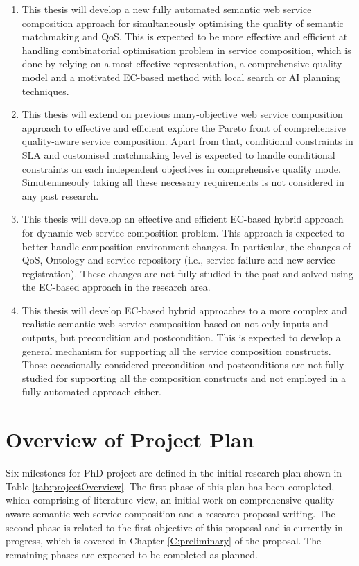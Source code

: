 \begin{enumerate}
 \item This thesis will develop a new fully automated semantic web service composition approach for simultaneously optimising the quality of semantic matchmaking and QoS. This is expected to be more effective and efficient at handling combinatorial optimisation problem in service composition, which is done by relying on a most effective representation, a comprehensive quality model and a motivated EC-based method with local search or AI planning techniques.

\item This thesis will extend on previous many-objective web service composition approach to effective and efficient explore the Pareto front of comprehensive quality-aware service composition. Apart from that, conditional constraints in SLA and customised matchmaking level is expected to handle conditional constraints on each independent objectives in comprehensive quality mode. Simutenaneouly taking all these necessary requirements is not considered in any past research. 

\item This thesis will develop an effective and efficient EC-based hybrid approach for dynamic web service composition problem. This approach is expected to better handle composition environment changes. In particular, the changes of QoS, Ontology and service repository (i.e., service failure and new service registration). These changes are not fully studied in the past and solved using the EC-based approach in the research area.

\item This thesis will develop EC-based hybrid approaches to a more complex and realistic semantic web service composition based on not only inputs and outputs, but precondition and postcondition. This is expected to develop a general mechanism for supporting all the service composition constructs. Those occasionally considered precondition and postconditions are not fully studied for supporting all the composition constructs and not employed in a fully automated approach either.
\end{enumerate}

\section{Overview of Project Plan}

Six milestones for PhD project are defined in the initial research plan shown in Table \ref{tab:projectOverview}. The first phase of this plan has been completed, which comprising of literature view, an initial work on comprehensive quality-aware semantic web service composition and a research proposal writing.  The second phase is related to the first objective of this proposal and is currently in progress, which is covered in Chapter \ref{C:preliminary} of the proposal. The remaining phases are expected to be completed as planned.

